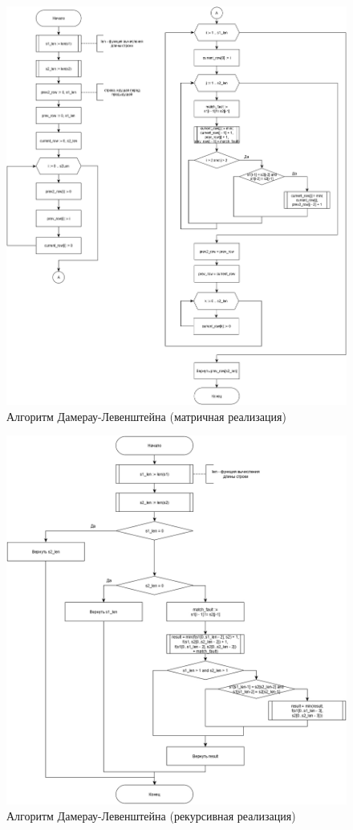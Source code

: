 \documentclass[12pt]{report}
\begin{document}
	\begin{figure}
		\centering
		\includegraphics[width=1\linewidth]{damleven}
		\caption{Алгоритм Дамерау-Левенштейна (матричная реализация)}
		\label{fig:damleven}
	\end{figure}
	
	\begin{figure}
		\centering
		\includegraphics[width=1\linewidth]{damleven_r}
		\caption{Алгоритм Дамерау-Левенштейна (рекурсивная реализация)}
		\label{fig:damlevenr}
	\end{figure}
	
\end{document}
